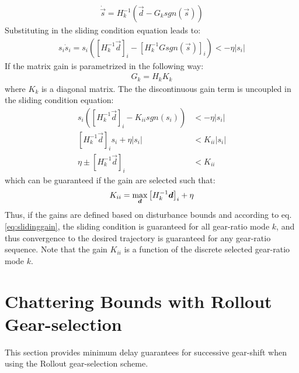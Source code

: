 %
\begin{align}
\dot{\vec{s}} = H_k^{-1}(\vec{d} - G_k sgn( \vec{s} ))
\end{align}
%
Substituting in the sliding condition equation leads to:
%
\begin{align}
s_i \dot{s}_i  = s_i \left( \left[ H_k^{-1} \vec{d} \right]_i - \left[ H_k^{-1} G sgn(\vec{s}) \right]_i \right) < -\eta |s_i|
\end{align}
%
If the matrix gain is parametrized in the following way:
%
\begin{align}
G_k = H_k K_k
\end{align}
%
where $K_k$ is a diagonal matrix. The the discontinuous gain term is uncoupled in the sliding condition equation:
%
\begin{align}
s_i \left( \left[ H_k^{-1} \vec{d} \right]_i - K_{ii} sgn( s_i ) \right) &< -\eta |s_i| \\
 \left[ H_k^{-1} \vec{d} \right]_i s_i + \eta |s_i| &< K_{ii} | s_i | \\
 \eta  \pm  \left[ H_k^{-1} \vec{d} \right]_i &< K_{ii} 
\end{align}
%
which can be guaranteed if the gain are selected such that:
%
\begin{align}
K_{ii} = \operatornamewithlimits{max}\limits_{\vec{d}} \left[ H_k^{-1} \vec{d} \right]_i + \eta
\label{eq:slidinggain}
\end{align}
%
Thus, if the gains are defined based on disturbance bounds and according to eq.\eqref{eq:slidinggain}, the sliding condition is guaranteed for all gear-ratio mode $k$, and thus convergence to the desired trajectory is guaranteed for any gear-ratio sequence. Note that the gain $K_{ii}$ is a function of the discrete selected gear-ratio mode $k$. 





\section{Chattering Bounds with Rollout Gear-selection}
\label{sec:chat}

This section provides minimum delay guarantees for successive gear-shift when using the Rollout gear-selection scheme. 

